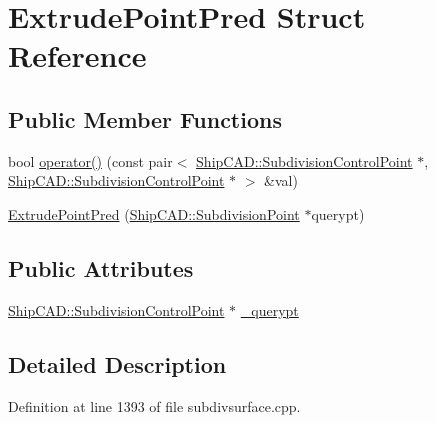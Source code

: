 \hypertarget{structExtrudePointPred}{\section{Extrude\-Point\-Pred Struct Reference}
\label{structExtrudePointPred}
}
\subsection*{Public Member Functions}
\begin{DoxyCompactItemize}
\item 
bool \hyperlink{structExtrudePointPred_ab8901a2a46f147e81c80c25b0492c772}{operator()} (const pair$<$ \hyperlink{classShipCAD_1_1SubdivisionControlPoint}{Ship\-C\-A\-D\-::\-Subdivision\-Control\-Point} $\ast$, \hyperlink{classShipCAD_1_1SubdivisionControlPoint}{Ship\-C\-A\-D\-::\-Subdivision\-Control\-Point} $\ast$ $>$ \&val)
\item 
\hyperlink{structExtrudePointPred_ac213b3b8d1bdc5a72e0a5a4ed53d9439}{Extrude\-Point\-Pred} (\hyperlink{classShipCAD_1_1SubdivisionPoint}{Ship\-C\-A\-D\-::\-Subdivision\-Point} $\ast$querypt)
\end{DoxyCompactItemize}
\subsection*{Public Attributes}
\begin{DoxyCompactItemize}
\item 
\hyperlink{classShipCAD_1_1SubdivisionControlPoint}{Ship\-C\-A\-D\-::\-Subdivision\-Control\-Point} $\ast$ \hyperlink{structExtrudePointPred_af9fa40238ef74aca6b8f8d7e303aafb4}{\-\_\-querypt}
\end{DoxyCompactItemize}


\subsection{Detailed Description}


Definition at line 1393 of file subdivsurface.\-cpp.



